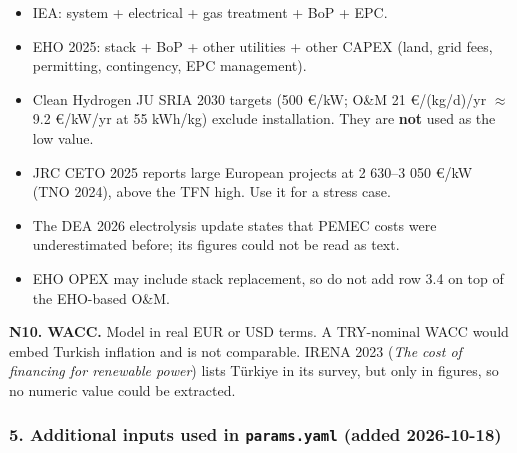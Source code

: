 \documentclass[11pt,a4paper]{article}
\begin{document}
\begin{itemize}\setlength\itemsep{1pt}

  \item IEA: system + electrical + gas treatment + BoP + EPC.

  \item EHO 2025: stack + BoP + other utilities + other CAPEX (land, grid fees, permitting, contingency, EPC management).

  \item Clean Hydrogen JU SRIA 2030 targets (500 \euro{}/kW; O\&M 21 \euro{}/(kg/d)/yr $\approx$ 9.2 \euro{}/kW/yr at 55 kWh/kg) exclude installation. They are \textbf{not} used as the low value.

  \item JRC CETO 2025 reports large European projects at 2 630--3 050 \euro{}/kW (TNO 2024), above the TFN high. Use it for a stress case.

  \item The DEA 2026 electrolysis update states that PEMEC costs were underestimated before; its figures could not be read as text.

  \item EHO OPEX may include stack replacement, so do not add row 3.4 on top of the EHO-based O\&M.

\end{itemize}

\textbf{N10. WACC.} Model in real EUR or USD terms. A TRY-nominal WACC would embed Turkish inflation and is not comparable. IRENA 2023 (\textit{The cost of financing for renewable power}) lists Türkiye in its survey, but only in figures, so no numeric value could be extracted.

\subsubsection{5. Additional inputs used in \texttt{params.yaml} (added 2026-10-18)}
\end{document}

